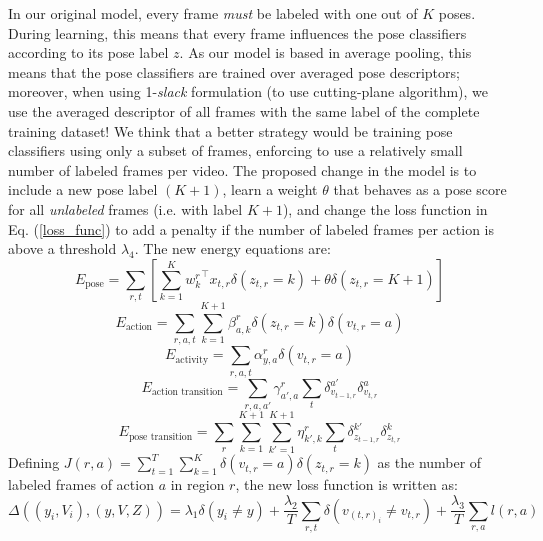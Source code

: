 \documentclass[10pt,letterpaper]{article}
\newcommand{\+}[1]{\ensuremath{{\boldsymbol #1}}}
\begin{document}
In our original model, every frame \emph{must} be labeled with one out of $K$ poses. During learning, this means that every frame influences the pose classifiers according to its pose label $z$. As our model is based in average pooling, this means that the pose classifiers are trained over averaged pose descriptors; moreover, when using 1-\emph{slack} formulation (to use cutting-plane algorithm), we use the averaged descriptor of all frames with the same label of the complete training dataset! We think that a better strategy would be training pose classifiers using only a subset of frames, enforcing to use a relatively small number of labeled frames per video. The proposed change in the model is to include a new pose label $(K+1)$, learn a weight $\theta$ that behaves as a pose score for all \emph{unlabeled} frames (i.e. with label $K+1$), and change the loss function in Eq. (\ref{loss_func}) to add a penalty if the number of labeled frames per action is above a threshold $\lambda_4$. The new energy equations are:  
%
\begin{equation}
E_{\text{pose}} = \sum_{r,t} \left[ \sum_{k=1}^K {w^r_k}^\top x_{t,r}\delta(z_{t,r} = k) + \theta\delta(z_{t,r}=K+1)\right]
\end{equation}
%
\begin{equation}
E_{\text{action}} =  \sum_{r,a,t} \sum_{k=1}^{K+1} \beta^r_{a,k} \delta(z_{t,r}=k) \delta(v_{t,r}=a)
\end{equation}
%
\begin{equation}
E_{\text{activity}} = \sum_{r,a,t}  \alpha^r_{y,a} \delta(v_{t,r}=a)
\end{equation}
%
\begin{equation}
E_{\text{action transition}} = \sum_{r,a,a'}  \gamma^r_{a',a} \sum_{t} \delta_{v_{t-1,r}}^{a'}\delta_{v_{t,r}}^a 
\end{equation}
%
\begin{equation}
E_{\text{pose transition}} =\sum_{r} \sum_{k=1}^{K+1}\sum_{k'=1}^{K+1}  \eta^r_{k',k}\sum_{t}\delta_{z_{t-1,r}}^{k'}\delta_{z_{t,r}}^{k}
\end{equation}
%
Defining $J(r,a) =\sum_{t=1}^T \sum_{k=1}^K \delta(v_{t,r} = a)\delta(z_{t,r}=k)$ as the number of labeled frames of action $a$ in region $r$, the new loss function is written as:
%
\begin{equation}
\label{new_loss_func}
\Delta( (y_i, V_i), (y, V, Z)) =
  \lambda_1 \delta(y_i \neq y)
+  \frac{\lambda_2}{T}  \sum_{r,t} \delta(v_{{(t,r)}_i} \neq v_{t,r} ) + \frac{\lambda_3}{T} \sum_{r,a} l(r,a)
\end{equation}
\end{document}

